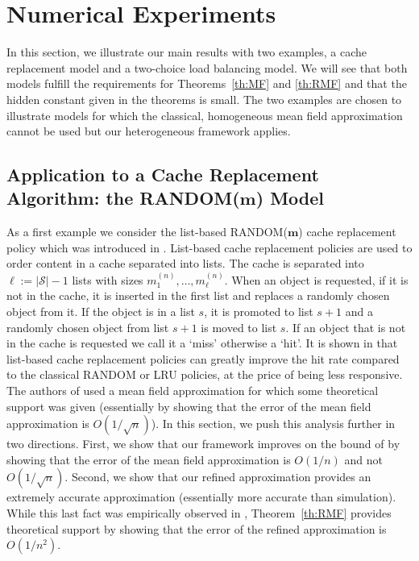 \documentclass[acmsmall]{acmart}
\newcommand\bm{\mathbf{m}}
\newcommand\calS{\mathcal{S}}
\newcommand\toN{^{(n)}}
\begin{document}

\section{Numerical Experiments}
\label{sec:numerical}

In this section, we illustrate our main results with two examples, a cache replacement model and a two-choice load balancing model. We will see that both models fulfill the requirements for Theorems~\ref{th:MF} and \ref{th:RMF} and that the hidden constant given in the theorems is small. The two examples are chosen to illustrate models for which the classical, homogeneous mean field approximation cannot be used but our heterogeneous framework applies. 


\subsection{Application to a Cache Replacement Algorithm: the RANDOM($\bm$) Model}
\label{ssec:cache}

As a first example we consider the list-based RANDOM($\bm$) cache replacement policy which was introduced in \cite{gastTransientSteadystateRegime2015,hazewinkelStochasticAnalysisComputer1987}. List-based cache replacement policies are used to order content in a cache separated into lists.  The cache is separated into $\ell:=|\calS|-1$ lists with sizes $m_1\toN,\ldots,m_\ell\toN$. When an object is requested, if it is not in the cache, it is inserted in the first list and replaces a randomly chosen object from it. If the object is in a list $s$, it is promoted to list $s+1$ and a randomly chosen object from list $s+1$ is moved to list $s$. If an object that is not in the cache is requested we call it a `miss' otherwise a `hit'. It is shown in \cite{gastTransientSteadystateRegime2015} that list-based cache replacement policies can greatly improve the hit rate compared to the classical RANDOM or LRU policies, at the price of being less responsive. The authors of \cite{gastTransientSteadystateRegime2015} used a mean field approximation for which some theoretical support was given (essentially by showing that the error of the mean field approximation is $O(1/\sqrt{n})$). In this section, we push this analysis further in two directions. First, we show that our framework improves on the bound of \cite{gastTransientSteadystateRegime2015} by showing that the error of the mean field approximation is $O(1/n)$ and not $O(1/\sqrt{n})$. Second, we show that our refined approximation provides an extremely accurate approximation (essentially more accurate than simulation). While this last fact was empirically observed in \cite{casale2020performance}, Theorem~\ref{th:RMF} provides theoretical support by showing that the error of the refined approximation is $O(1/n^2)$. 
\end{document}
